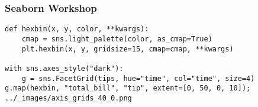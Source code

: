 \documentclass{beamer}
\begin{document}
\begin{frame}[fragile]
	\frametitle{Seaborn Workshop}
	\large
\begin{verbatim}
def hexbin(x, y, color, **kwargs):
    cmap = sns.light_palette(color, as_cmap=True)
    plt.hexbin(x, y, gridsize=15, cmap=cmap, **kwargs)

with sns.axes_style("dark"):
    g = sns.FacetGrid(tips, hue="time", col="time", size=4)
g.map(hexbin, "total_bill", "tip", extent=[0, 50, 0, 10]);
../_images/axis_grids_40_0.png
\end{verbatim}
\end{frame}

\end{document}
